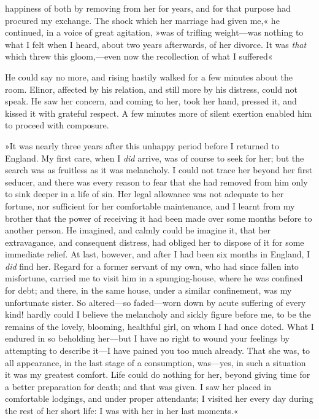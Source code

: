 happiness of both by removing from her for years, and for that purpose had procured my exchange. The shock which her marriage had given me,« he continued, in a voice of great agitation, »was of trifling weight—was nothing to what I felt when I heard, about two years afterwards, of her divorce. It was \textit{that} which threw this gloom,—even now the recollection of what I suffered\longdash«

He could say no more, and rising hastily walked for a few minutes about the room. Elinor, affected by his relation, and still more by his distress, could not speak. He saw her concern, and coming to her, took her hand, pressed it, and kissed it with grateful respect. A few minutes more of silent exertion enabled him to proceed with composure.

»It was nearly three years after this unhappy period before I returned to England. My first care, when I \textit{did} arrive, was of course to seek for her; but the search was as fruitless as it was melancholy. I could not trace her beyond her first seducer, and there was every reason to fear that she had removed from him only to sink deeper in a life of sin. Her legal allowance was not adequate to her fortune, nor sufficient for her comfortable maintenance, and I learnt from my brother that the power of receiving it had been made over some months before to another person. He imagined, and calmly could he imagine it, that her extravagance, and consequent distress, had obliged her to dispose of it for some immediate relief. At last, however, and after I had been six months in England, I \textit{did} find her. Regard for a former servant of my own, who had since fallen into misfortune, carried me to visit him in a spunging-house, where he was confined for debt; and there, in the same house, under a similar confinement, was my unfortunate sister. So altered—so faded—worn down by acute suffering of every kind! hardly could I believe the melancholy and sickly figure before me, to be the remains of the lovely, blooming, healthful girl, on whom I had once doted. What I endured in so beholding her—but I have no right to wound your feelings by attempting to describe it—I have pained you too much already. That she was, to all appearance, in the last stage of a consumption, was—yes, in such a situation it was my greatest comfort. Life could do nothing for her, beyond giving time for a better preparation for death; and that was given. I saw her placed in comfortable lodgings, and under proper attendants; I visited her every day during the rest of her short life: I was with her in her last moments.«

